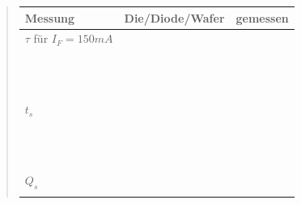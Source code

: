 \begin{quote}
       \begin{table}[h]
     \begin{addmargin}[-1cm]{3cm}
     \centering
                      \begin{tabular}{|p{3cm}|p{3cm}|p{10.2cm}|}
         \hline
         Messung & Die/Diode/Wafer & gemessen\\
         \hline
         $\tau$ für $I_{F}=150 mA$ & & \\
                                 & & \\
                                 & & \\
                                 & & \\
                                 & & \\
                                 & & \\
                                 & & \\
                                 & & \\
                                 & & \\
                                 & & \\
                                 & & \\
                                 & & \\
                                 & & \\
         \hline
         $t_{s}$ & & \\
                                 & & \\
                                 & & \\
                                 & & \\
                                 & & \\
                                 & & \\
                                 & & \\
                                 & & \\
                                 & & \\
                                 & & \\
                                 & & \\
                                 & & \\
                                 & & \\
         \hline
         $Q_{s}$ & &\\
                                 & & \\

\end{tabular}
\end{addmargin}
\end{table}
\end{quote}
